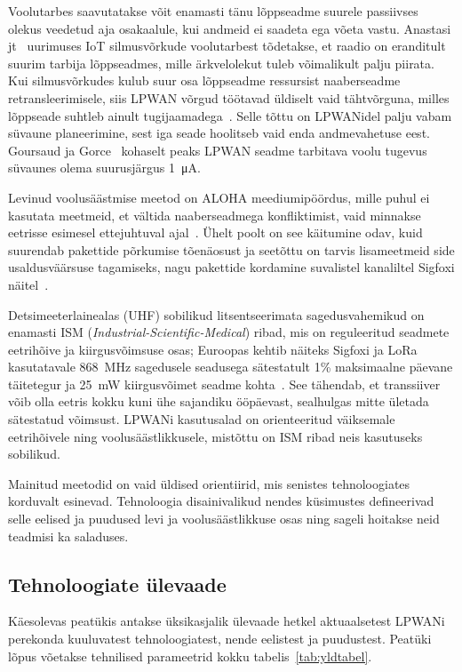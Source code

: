\documentclass[12pt]{article}
\begin{document}
    Voolutarbes saavutatakse võit enamasti tänu lõppseadme suurele passiivses olekus veedetud aja osakaalule, kui andmeid ei saadeta ega võeta vastu.
    Anastasi jt~\cite{anastasi} uurimuses IoT silmusvõrkude voolutarbest tõdetakse, et raadio on eranditult suurim tarbija lõppseadmes, mille ärkvelolekut tuleb võimalikult palju piirata.
    Kui silmusvõrkudes kulub suur osa lõppseadme ressursist naaberseadme retransleerimisele, siis LPWAN võrgud töötavad üldiselt vaid tähtvõrguna, milles lõppseade suhtleb ainult tugijaamadega~\cite{centenaro}.
    Selle tõttu on LPWANidel palju vabam süvaune planeerimine, sest iga seade hoolitseb vaid enda andmevahetuse eest.
    Goursaud ja Gorce~\cite{goursaud} kohaselt peaks LPWAN seadme tarbitava voolu tugevus süvaunes olema suurusjärgus \SI{1}{\micro\ampere}.

    Levinud voolusäästmise meetod on ALOHA meediumipöördus, mille puhul ei kasutata meetmeid, et vältida naaberseadmega konfliktimist, vaid minnakse eetrisse esimesel ettejuhtuval ajal~\cite{raza}.
    Ühelt poolt on see käitumine odav, kuid suurendab pakettide põrkumise tõenäosust ja seetõttu on tarvis lisameetmeid side usaldusväärsuse tagamiseks, nagu pakettide kordamine suvalistel kanaliltel Sigfoxi näitel~\cite{raza}.

    Detsimeeterlainealas (UHF) sobilikud litsentseerimata sagedusvahemikud on enamasti ISM (\textit{Industrial-Scientific-Medical}) ribad, mis on reguleeritud seadmete eetrihõive ja kiirgusvõimsuse osas; Euroopas kehtib näiteks Sigfoxi ja LoRa kasutatavale \SI{868}{\mega\hertz} sagedusele seadusega sätestatult 1\% maksimaalne päevane täitetegur ja \SI{25}{\milli\watt} kiirgusvõimet seadme kohta~\cite{etsi}.
    See tähendab, et transsiiver võib olla eetris kokku kuni ühe sajandiku ööpäevast, sealhulgas mitte ületada sätestatud võimsust.
    LPWANi kasutusalad on orienteeritud väiksemale eetrihõivele ning voolusäästlikkusele, mistõttu on ISM ribad neis kasutuseks sobilikud.

    Mainitud meetodid on vaid üldised orientiirid, mis senistes tehnoloogiates korduvalt esinevad.
    Tehnoloogia disainivalikud nendes küsimustes defineerivad selle eelised ja puudused levi ja voolusäästlikkuse osas ning sageli hoitakse neid teadmisi ka saladuses.

    \subsection{Tehnoloogiate ülevaade}

    Käesolevas peatükis antakse üksikasjalik ülevaade hetkel aktuaalsetest LPWANi perekonda kuuluvatest tehnoloogiatest, nende eelistest ja puudustest.
    Peatüki lõpus võetakse tehnilised parameetrid kokku tabelis~\ref{tab:yldtabel}.
\end{document}
